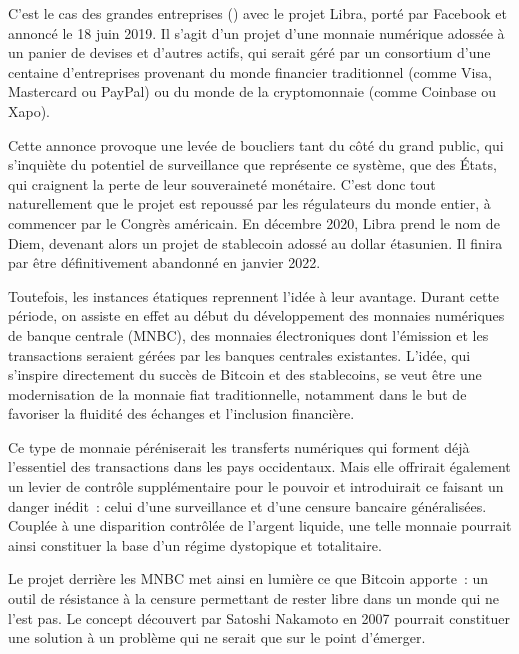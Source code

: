 C'est le cas des grandes entreprises () avec le projet Libra, porté par Facebook et annoncé le 18 juin 2019. Il s'agit d'un projet d'une monnaie numérique adossée à un panier de devises et d'autres actifs, qui serait géré par un consortium d'une centaine d'entreprises provenant du monde financier traditionnel (comme Visa, Mastercard ou PayPal) ou du monde de la cryptomonnaie (comme Coinbase ou Xapo).

Cette annonce provoque une levée de boucliers tant du côté du grand public, qui s'inquiète du potentiel de surveillance que représente ce système, que des États, qui craignent la perte de leur souveraineté monétaire. C'est donc tout naturellement que le projet est repoussé par les régulateurs du monde entier, à commencer par le Congrès américain. En décembre 2020, Libra prend le nom de Diem, devenant alors un projet de stablecoin adossé au dollar étasunien. Il finira par être définitivement abandonné en janvier 2022.

Toutefois, les instances étatiques reprennent l'idée à leur avantage. Durant cette période, on assiste en effet au début du développement des monnaies numériques de banque centrale (MNBC), des monnaies électroniques dont l'émission et les transactions seraient gérées par les banques centrales existantes. L'idée, qui s'inspire directement du succès de Bitcoin et des stablecoins, se veut être une modernisation de la monnaie fiat traditionnelle, notamment dans le but de favoriser la fluidité des échanges et l'inclusion financière.

Ce type de monnaie péréniserait les transferts numériques qui forment déjà l'essentiel des transactions dans les pays occidentaux. Mais elle offrirait également un levier de contrôle supplémentaire pour le pouvoir et introduirait ce faisant un danger inédit~: celui d'une surveillance et d'une censure bancaire généralisées. Couplée à une disparition contrôlée de l'argent liquide, une telle monnaie pourrait ainsi constituer la base d'un régime dystopique et totalitaire.

Le projet derrière les MNBC met ainsi en lumière ce que Bitcoin apporte~: un outil de résistance à la censure permettant de rester libre dans un monde qui ne l'est pas. Le concept découvert par Satoshi Nakamoto en 2007 pourrait constituer une solution à un problème qui ne serait que sur le point d'émerger.

